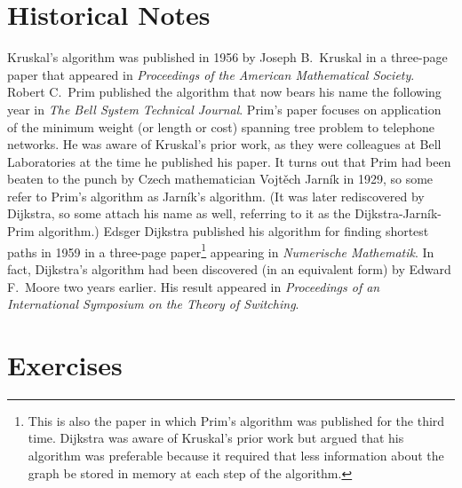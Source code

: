 \section{Historical Notes}\label{s:graphalgorithms:historical-notes}

Kruskal's algorithm was published in 1956 by Joseph B.\ Kruskal in a
three-page paper that appeared in \emph{Proceedings of the American
  Mathematical Society}. Robert C.\ Prim published the algorithm that
now bears his name the following year in \emph{The Bell System
  Technical Journal}. Prim's paper focuses on application of the
minimum weight (or length or cost) spanning tree problem to telephone
networks. He was aware of Kruskal's prior work, as they were
colleagues at Bell Laboratories at the time he published his paper. It
turns out that Prim had been beaten to the punch by Czech
mathematician Vojt\v{e}ch Jarn\'{i}k in 1929, so some refer to Prim's
algorithm as Jarn\'{i}k's algorithm. (It was later rediscovered by
Dijkstra, so some attach his name as well, referring to it as the
Dijkstra-Jarn\'{i}k-Prim algorithm.) Edsger Dijkstra published his
algorithm for finding shortest paths in 1959 in a three-page
paper\footnote{This is also the paper in which Prim's algorithm was
  published for the third time. Dijkstra was aware of Kruskal's prior
  work but argued that his algorithm was preferable because it
  required that less information about the graph be stored in memory
  at each step of the algorithm.}  appearing in \emph{Numerische
  Mathematik}. In fact, Dijkstra's algorithm had been discovered (in
an equivalent form) by Edward F.\ Moore two years earlier. His result
appeared in \emph{Proceedings of an International Symposium on the
  Theory of Switching}.

\section{Exercises}\label{s:graphalgorithms:exercises}

